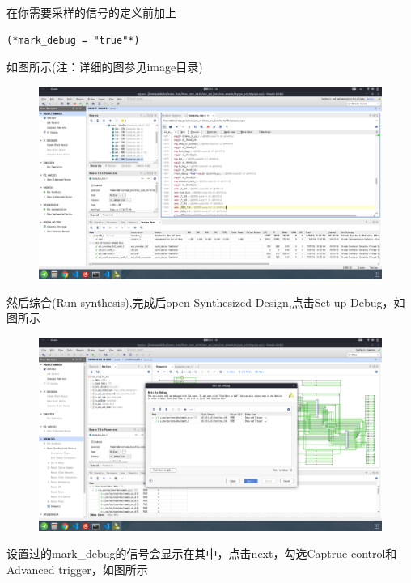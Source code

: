 \documentclass[lang=cn,11pt,a4paper]{elegantpaper}
\begin{document}
在你需要采样的信号的定义前加上 
\begin{lstlisting}
(*mark_debug = "true"*)
\end{lstlisting}
如图所示(注：详细的图参见image目录)
\begin{figure}[H]
\centering
\includegraphics[width=\linewidth]{image/mark_debug_1.png}
\end{figure}

然后综合(Run synthesis),完成后open Synthesized Design,点击Set up Debug，如图所示
\begin{figure}[H]
\centering
\includegraphics[width=\linewidth]{image/mark_debug_2.png}
\end{figure}
设置过的mark\_debug的信号会显示在其中，点击next，勾选Captrue control和Advanced trigger，如图所示
\end{document}

